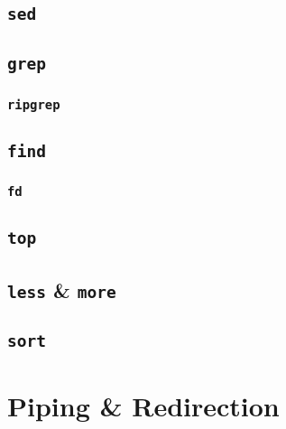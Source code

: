 \documentclass[
]{book}
\begin{document}
\hypertarget{sed}{%
\subsection{\texorpdfstring{\texttt{sed}}{sed}}\label{sed}}

\hypertarget{grep}{%
\subsection{\texorpdfstring{\texttt{grep}}{grep}}\label{grep}}

\hypertarget{rg}{%
\subsubsection{\texorpdfstring{\texttt{ripgrep}}{ripgrep}}\label{rg}}

\hypertarget{find}{%
\subsection{\texorpdfstring{\texttt{find}}{find}}\label{find}}

\hypertarget{fd}{%
\subsubsection{\texorpdfstring{\texttt{fd}}{fd}}\label{fd}}

\hypertarget{top}{%
\subsection{\texorpdfstring{\texttt{top}}{top}}\label{top}}

\hypertarget{less-and-more}{%
\subsection{\texorpdfstring{\texttt{less} \& \texttt{more}}{less \& more}}\label{less-and-more}}

\hypertarget{sort}{%
\subsection{\texorpdfstring{\texttt{sort}}{sort}}\label{sort}}

\hypertarget{piping-and-redirection}{%
\section{Piping \& Redirection}\label{piping-and-redirection}}
\end{document}
